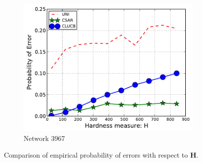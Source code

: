 \documentclass{article}
\begin{document}
\begin{figure}[htbp]
\begin{subfigure}[c]{\imgsize\textwidth}
	\includegraphics[width=\textwidth]{fig/exp/mst-c-3967}
	\caption{Network 3967}
\end{subfigure}
\caption{Comparison of empirical probability of errors  with respect to $\mathbf H$.}
\label{fig:exp1}
\end{figure}
\end{document}
